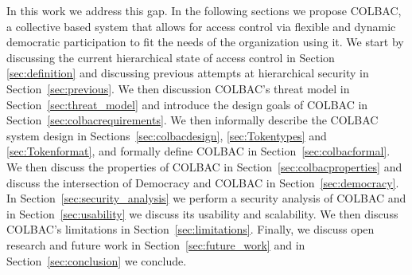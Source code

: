 In this work we address this gap. In the following sections we propose COLBAC, a
collective based system that allows for access control via flexible and dynamic
democratic participation to fit the needs of the organization using it. We start
by discussing the current hierarchical state of access control in Section
\ref{sec:definition} and discussing previous attempts at hierarchical security
in Section~\ref{sec:previous}. We then discussion COLBAC's threat model in
Section~\ref{sec:threat_model} and introduce the design goals of COLBAC in
Section~\ref{sec:colbacrequirements}. We then informally describe the COLBAC
system design in Sections~\ref{sec:colbacdesign}, \ref{sec:Tokentypes} and 
\ref{sec:Tokenformat}, and formally define COLBAC in
Section~\ref{sec:colbacformal}. We then discuss the properties of COLBAC in
Section~\ref{sec:colbacproperties} and discuss the intersection of Democracy and
COLBAC in Section~\ref{sec:democracy}. In Section~\ref{sec:security_analysis} we
perform a security analysis of COLBAC and in Section~\ref{sec:usability} we
discuss its usability and scalability. We then discuss COLBAC's limitations
in Section~\ref{sec:limitations}. Finally, we discuss open research and future
work in Section~\ref{sec:future_work} and in Section~\ref{sec:conclusion} we
conclude.
%
%
